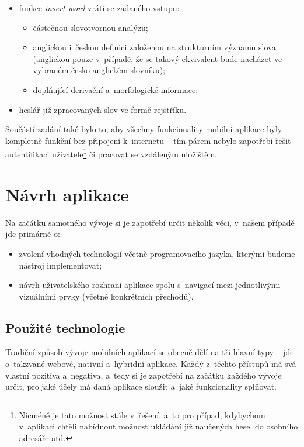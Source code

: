\begin{itemize}
\tightlist
\item
  funkce \emph{insert word} \rigtharrow vrátí se zadaného vstupu:

  \begin{itemize}
  \tightlist
  \item
    částečnou slovotvornou analýzu;
  \item
    anglickou i~českou definici založenou na strukturním významu slova
    (anglickou pouze v~případě, že se takový ekvivalent bude nacházet ve
    vybraném česko-anglickém slovníku);
  \item
    doplňující derivační a~morfologické informace;
  \end{itemize}
\item
  heslář již zpracovaných slov ve formě rejstříku.
\end{itemize}

Součástí zadání také bylo to, aby všechny funkcionality mobilní aplikace
byly kompletně funkční bez připojení k~internetu -- tím párem nebylo
zapotřebí řešit autentifikaci
uživatele\footnote{Nicméně je tato možnost stále v~řešení, a~to pro případ, kdybychom v~aplikaci chtěli nabídnout možnost ukládání již naučených hesel do osobního adresáře atd.}
či pracovat se vzdáleným uložištěm.

\hypertarget{nuxe1vrh-aplikace}{%
\section{Návrh aplikace}\label{nuxe1vrh-aplikace}}

Na začátku samotného vývoje si je zapotřebí určit několik věci, v~našem
případě jde primárně o:

\begin{itemize}
\tightlist
\item
  zvolení vhodných technologií včetně programovacího jazyka, kterými
  budeme nástroj implementovat;
\item
  návrh uživatelského rozhraní aplikace spolu s~navigací mezi
  jednotlivými vizuálními prvky (včetně konkrétních přechodů).
\end{itemize}

\hypertarget{pouux17eituxe9-technologie}{%
\subsection{Použité technologie}\label{pouux17eituxe9-technologie}}

Tradiční způsob vývoje mobilních aplikací se obecně dělí na tři hlavní
typy -- jde o~takzvané webové, nativní a~hybridní aplikace. Každý
z~těchto přístupů má svá vlastní pozitiva a~negativa, a~tedy si je
zapotřebí na začátku každého vývoje určit, pro jaké účely má daná
aplikace sloužit a~jaké funkcionality splňovat.

